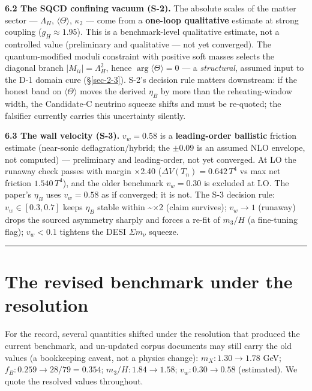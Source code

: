 \documentclass[aps,prd,preprint,nofootinbib,superscriptaddress]{revtex4-2}
\begin{document}
\textbf{6.2 The SQCD confining vacuum (S-2).} The absolute scales of the
matter sector --- \(\Lambda_H\), \(\langle\Theta\rangle\), \(\kappa_2\)
--- come from a \textbf{one-loop qualitative} estimate at strong
coupling (\(g_H \approx 1.95\)). This is a benchmark-level qualitative
estimate, not a controlled value (preliminary and qualitative --- not
yet converged). The quantum-modified moduli constraint with positive
soft masses selects the diagonal branch \(|M_{ii}| = \Lambda_H^{2}\),
hence \(\arg\langle\Theta\rangle = 0\) --- a \emph{structural}, assumed
input to the D-1 domain cure (§\ref{sec-2-3}). S-2's decision rule
matters downstream: if the honest band on \(\langle\Theta\rangle\) moves
the derived \(\eta_B\) by more than the reheating-window width, the
Candidate-C neutrino squeeze shifts and must be re-quoted; the falsifier
currently carries this uncertainty silently.

\textbf{6.3 The wall velocity (S-3).} \(v_w = 0.58\) is a
\textbf{leading-order ballistic} friction estimate (near-sonic
deflagration/hybrid; the \(\pm0.09\) is an assumed NLO envelope, not
computed) --- preliminary and leading-order, not yet converged. At LO
the runaway check passes with margin ×2.40
(\(\Delta V(T_n) = 0.642\, T^{4}\) vs max net friction
\(1.540\, T^{4}\)), and the older benchmark \(v_w = 0.30\) is excluded
at LO. The paper's \(\eta_B\) uses \(v_w = 0.58\) as if converged; it is
not. The S-3 decision rule: \(v_w \in [0.3, 0.7]\) keeps \(\eta_B\)
stable within \textasciitilde×2 (claim survives); \(v_w \to 1\)
(runaway) drops the sourced asymmetry sharply and forces a re-fit of
\(m_3/H\) (a fine-tuning flag); \(v_w < 0.1\) tightens the DESI
\(\Sigma m_\nu\) squeeze.

\begin{center}\rule{0.5\linewidth}{0.5pt}\end{center}

\section{The revised benchmark under the resolution}\label{sec-7}

For the record, several quantities shifted under the resolution that
produced the current benchmark, and un-updated corpus documents may
still carry the old values (a bookkeeping caveat, not a physics change):
\(m_X: 1.30 \to 1.78\) GeV; \(f_B: 0.259 \to 28/79 = 0.354\);
\(m_3/H: 1.84 \to 1.58\); \(v_w: 0.30 \to 0.58\) (estimated). We quote
the resolved values throughout.
\end{document}
